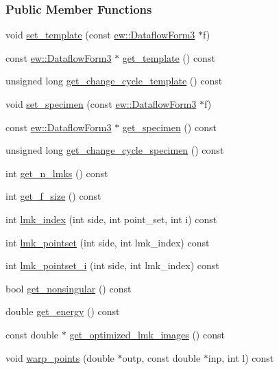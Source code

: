 \subsubsection*{Public Member Functions}
\begin{DoxyCompactItemize}
\item 
void \hyperlink{classew_1_1DataflowSpline3_a568e3304e82c3659bf60db90857cdbb3}{set\_\-template} (const \hyperlink{classew_1_1DataflowForm3}{ew::DataflowForm3} $\ast$f)
\item 
const \hyperlink{classew_1_1DataflowForm3}{ew::DataflowForm3} $\ast$ \hyperlink{classew_1_1DataflowSpline3_a539e7fc0d4121a31b383a766c243cea7}{get\_\-template} () const 
\item 
unsigned long \hyperlink{classew_1_1DataflowSpline3_af99ac5e26b81ddc18d09713d7ebdc00d}{get\_\-change\_\-cycle\_\-template} () const 
\item 
void \hyperlink{classew_1_1DataflowSpline3_a08c3a3fb2c36969894afa0256282f76c}{set\_\-specimen} (const \hyperlink{classew_1_1DataflowForm3}{ew::DataflowForm3} $\ast$f)
\item 
const \hyperlink{classew_1_1DataflowForm3}{ew::DataflowForm3} $\ast$ \hyperlink{classew_1_1DataflowSpline3_ad0463444434aed2f1b54f7ce16f493bd}{get\_\-specimen} () const 
\item 
unsigned long \hyperlink{classew_1_1DataflowSpline3_a14e8361646fc5fe098b670690038f10b}{get\_\-change\_\-cycle\_\-specimen} () const 
\item 
int \hyperlink{classew_1_1DataflowSpline3_afddea45da34e52c9f28582a1ccca07dd}{get\_\-n\_\-lmks} () const 
\item 
int \hyperlink{classew_1_1DataflowSpline3_aedeb4a2beed67c9ac49caf7300dcd9c5}{get\_\-f\_\-size} () const 
\item 
int \hyperlink{classew_1_1DataflowSpline3_a812346e97afeae66fe6cf9d462fb771a}{lmk\_\-index} (int side, int point\_\-set, int i) const 
\item 
int \hyperlink{classew_1_1DataflowSpline3_aa0a156725d9a29c9d278a2bb90d27d27}{lmk\_\-pointset} (int side, int lmk\_\-index) const 
\item 
int \hyperlink{classew_1_1DataflowSpline3_a49e2ffd2c78efb144d023da9f25d24ca}{lmk\_\-pointset\_\-i} (int side, int lmk\_\-index) const 
\item 
bool \hyperlink{classew_1_1DataflowSpline3_a546e8bf4ffd0f57d04df17a3ffeb8a4c}{get\_\-nonsingular} () const 
\item 
double \hyperlink{classew_1_1DataflowSpline3_a3da92ed8913113804b8d45a60894549b}{get\_\-energy} () const 
\item 
const double $\ast$ \hyperlink{classew_1_1DataflowSpline3_a7597bf0db3a9f8f861dfe5b76a4415fc}{get\_\-optimized\_\-lmk\_\-images} () const 
\item 
void \hyperlink{classew_1_1DataflowSpline3_a8624ee7efc3543e6457a28e05919c3dd}{warp\_\-points} (double $\ast$outp, const double $\ast$inp, int l) const 
\end{DoxyCompactItemize}
